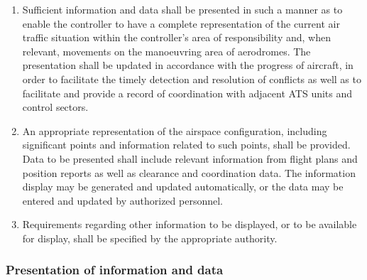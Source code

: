 \begin{enumerate}
    \item Sufficient information and data shall be presented in such a manner as to enable the controller to have a complete representation of the current air traffic situation within the controller's area of responsibility and, when relevant, movements on the manoeuvring area of aerodromes. The presentation shall be updated in accordance with the progress of aircraft, in order to facilitate the timely detection and resolution of conflicts as well as to facilitate and provide a record of coordination with adjacent ATS units and control sectors.
    \item An appropriate representation of the airspace configuration, including significant points and information related to such points, shall be provided. Data to be presented shall include relevant information from flight plans and position reports as well as clearance and coordination data. The information display may be generated and updated automatically, or the data may be entered and updated by authorized personnel.
    \item Requirements regarding other information to be displayed, or to be available for display, shall be specified by the appropriate authority.
\end{enumerate}

\subsubsection{Presentation of information and data}

